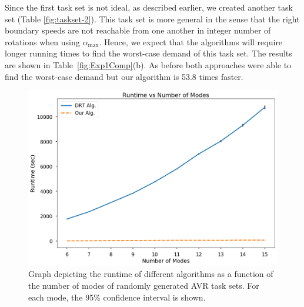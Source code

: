 \begin{table}
\begin{center}
\caption{Run time comparison of different algorithms}
\label{fig:Exp1Comp}

\end{center}
\end{table}
Since the first task set is not ideal, as described earlier, we created another task set (Table \ref{fig:taskset-2}). This task set is more general in the sense that the right boundary speeds are not reachable from one another in integer number of rotations when using $\alpha_{\max}$. Hence, we expect that the algorithms will require longer running times to find the worst-case demand of this task set.
The results are shown in Table~\ref{fig:Exp1Comp}(b). As before both approaches were able to find the worst-case demand but our algorithm is 53.8 times faster.

\begin{figure}
\centering
\includegraphics[width=1.0\linewidth]{fig/runtimePlot-confidence_intervals.png}
\caption{Graph depicting the runtime of different algorithms as a function of the number of modes of randomly generated AVR task sets. For each mode, the 95\% confidence interval is shown.}
\label{fig:finalgraph}
\end{figure}

